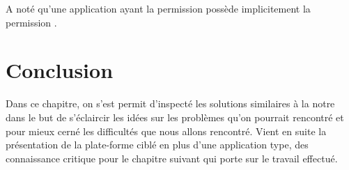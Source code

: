 A noté qu'une application ayant la permission  possède implicitement la permission .

\section{Conclusion}

Dans ce chapitre, on s'est permit d'inspecté les solutions similaires à la
notre dans le but de s'éclaircir les idées sur les problèmes qu'on pourrait
rencontré et pour mieux cerné les difficultés que nous allons rencontré. Vient
en suite la présentation de la plate-forme ciblé en plus d'une application
type, des connaissance critique pour le chapitre suivant qui porte sur le
travail effectué.